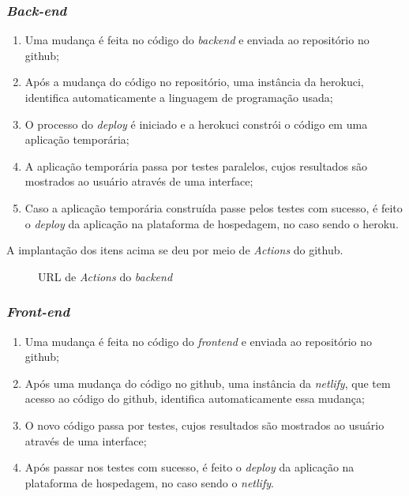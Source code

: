 \subsubsection{\textit{Back-end}}

\begin{enumerate}
	\item Uma mudança é feita no código do \textit{\gls{backend}} e enviada ao repositório no \gls{github};
    \item Após a mudança do código no repositório, uma instância da \gls{herokuci}, identifica automaticamente a linguagem de programação usada; 
    \item O processo do \textit{\gls{deploy}} é iniciado e a \gls{herokuci} constrói o código em uma aplicação temporária;
    \item A aplicação temporária passa por testes paralelos, cujos resultados são mostrados ao usuário através de uma interface;
    \item Caso a aplicação temporária construída passe pelos testes com sucesso, é feito o \textit{\gls{deploy}} da aplicação na plataforma de hospedagem, no caso sendo o \gls{heroku}.
\end{enumerate} 

A implantação dos itens acima se deu por meio de \textit{Actions} do \gls{github}.

\begin{figure}[htb]
	\caption{\label{qr-url-actions-back}URL de \textit{Actions} do \textit{\gls{backend}}}
	\begin{center}
	\end{center}
\end{figure}

\subsubsection{\textit{Front-end}}
\begin{enumerate}
	\item Uma mudança é feita no código do \textit{\gls{frontend}} e enviada ao repositório no \gls{github};
    \item Após uma mudança do código no \gls{github}, uma instância da \textit{\gls{netlify}}, que tem acesso ao código do \gls{github}, identifica automaticamente essa mudança;
    \item O novo código passa por testes, cujos resultados são mostrados ao usuário através de uma interface;
    \item Após passar nos testes com sucesso, é feito o \textit{\gls{deploy}} da aplicação na plataforma de hospedagem, no caso sendo o \textit{\gls{netlify}}.
\end{enumerate} 

